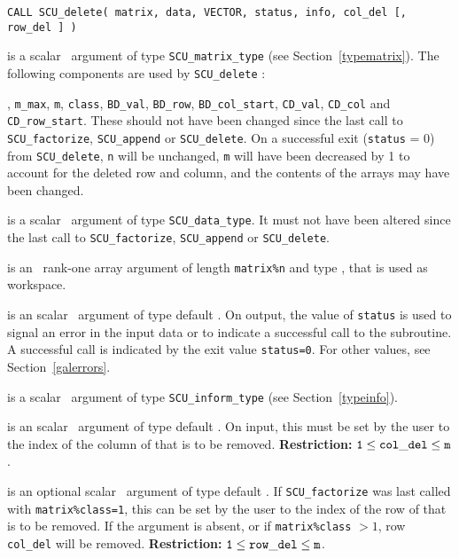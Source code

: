 \documentclass{galahad}
\newcommand{\packagename}{SCU}
\begin{document}
\hskip0.5in
{\tt CALL \packagename\_delete( matrix, data, VECTOR, status, info,
col\_del [, row\_del ] )}

\vspace*{-2mm}
\begin{description}
 is a scalar \intentinout\ argument of type
{\tt \packagename\_matrix\_type}
(see Section~\ref{typematrix}). The following components are used by
{\tt \packagename\_delete} :

\begin{description}
, {\tt m\_max}, {\tt m}, {\tt class},
{\tt BD\_val}, {\tt BD\_row}, {\tt BD\_col\_start},
{\tt CD\_val}, {\tt CD\_col} and {\tt CD\_row\_start}.
These should not have been changed since the last call to
{\tt \packagename\_factorize}, {\tt \packagename\_append} or
{\tt \packagename\_delete}.
On a successful exit ({\tt status} = 0) from {\tt \packagename\_delete},
{\tt n} will be unchanged, {\tt m} will have
been decreased by 1 to account for the deleted row and column, and
the contents of the arrays may have been changed.
\end{description}

 is a scalar \intentinout\ argument of type
{\tt \packagename\_data\_type}.
It must not have been altered since the last call to
{\tt \packagename\_factorize},
{\tt \packagename\_append} or
{\tt \packagename\_delete}.

 is an \intentout\ rank-one array argument of length
{\tt matrix\%n}
and type \realdp, that is used as workspace.

 is an scalar \intentout\ argument of type default
\integer.
On output, the value of {\tt status} is used to signal an error
in the input data or to indicate a successful call to the subroutine.
A successful call is indicated by the exit value {\tt status=0}.
For other values, see Section~\ref{galerrors}.

 is a scalar \intentinout\ argument of type
{\tt \packagename\_inform\_type}
(see Section~\ref{typeinfo}).

 is an scalar \intentin\ argument of type
default \integer.
On input, this must be set by the user to the index of the column of
 that is to be removed.
{\bf Restriction:} ${\tt 1} \leq {\tt col\_del} \leq {\tt m}$.

 is an optional scalar \intentin\ argument of type
default \integer.
If {\tt \packagename\_factorize} was last called with {\tt matrix\%class=1},
this can be set by the user to the index of
the row of  that is to be removed. If the argument is absent, or if
{\tt  matrix\%class} $> 1$, row {\tt col\_del} will be removed.
{\bf Restriction:} ${\tt 1} \leq {\tt row\_del} \leq {\tt m}$.

\end{description}
\end{document}
